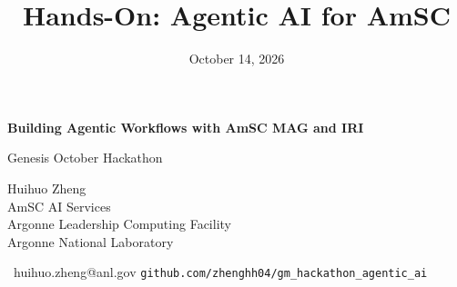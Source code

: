 \documentclass[aspectratio=169,11pt]{beamer}
\title{Hands-On: Agentic AI for AmSC}
\date{October 14, 2026}
\makeatletter
\newcommand{\deckauthor}{Huihuo Zheng}
\newcommand{\deckemail}{huihuo.zheng@anl.gov}
\newcommand{\deckinstitute}{AmSC AI Services\\Argonne Leadership Computing Facility\\Argonne National Laboratory}
\makeatother
\begin{document}
{
\begin{frame}[plain]
  \vfill
  {\Large\bfseries
    Building Agentic Workflows with AmSC MAG and IRI \par}
  \vspace{6pt}
  {\color{accentteal}\large
    Genesis October Hackathon \par}
  \vspace{14pt}
  {\small
    \deckauthor\\
    \deckinstitute\\
    \insertdate}
  \vfill
  {\footnotesize\color{midgray}\faEnvelope[regular]\ \deckemail
   \hfill\texttt{github.com/zhenghh04/gm\_hackathon\_agentic\_ai}\par}
\end{frame}
}
\end{document}
